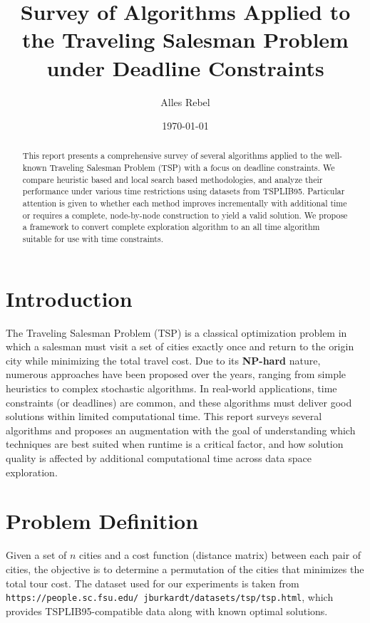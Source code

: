\documentclass[11pt]{article}
\title{Survey of Algorithms Applied to the Traveling Salesman Problem \\ under Deadline Constraints}
\author{Alles Rebel}
\date{\today}
\begin{document}
	\maketitle
	
	\begin{abstract}
		This report presents a comprehensive survey of several algorithms applied to the well-known Traveling Salesman Problem (TSP) with a focus on deadline constraints. We compare heuristic based and local search based methodologies, and analyze their performance under various time restrictions using datasets from TSPLIB95. Particular attention is given to whether each method improves incrementally with additional time or requires a complete, node-by-node construction to yield a valid solution. We propose a framework to convert complete exploration algorithm to an all time algorithm suitable for use with time constraints.
	\end{abstract}
	
	\section{Introduction}
	The Traveling Salesman Problem (TSP) is a classical optimization problem in which a salesman must visit a set of cities exactly once and return to the origin city while minimizing the total travel cost. Due to its \textbf{NP-hard} nature, numerous approaches have been proposed over the years, ranging from simple heuristics to complex stochastic algorithms. In real-world applications, time constraints (or deadlines) are common, and these algorithms must deliver good solutions within limited computational time. This report surveys several algorithms and proposes an augmentation with the goal of understanding which techniques are best suited when runtime is a critical factor, and how solution quality is affected by additional computational time across data space exploration.
	
	\section{Problem Definition}
	Given a set of $n$ cities and a cost function (distance matrix) between each pair of cities, the objective is to determine a permutation of the cities that minimizes the total tour cost. The dataset used for our experiments is taken from \texttt{https://people.sc.fsu.edu/~jburkardt/datasets/tsp/tsp.html}\cite{Dataset}, which provides TSPLIB95-compatible\cite{TSPLIB} data along with known optimal solutions.
	
\end{document}
